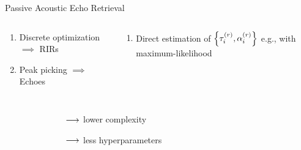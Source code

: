 \begin{frame}[t]{\alert{Passive} Acoustic Echo Retrieval \hfill\faBook}
        \vspace{.5em}
        \begin{columns}[T,onlytextwidth] %
            \begin{column}{.48\textwidth}
                \small
                \begin{enumerate}
                    \item Discrete optimization $\implies$ RIRs
                    \item Peak picking $\implies$ Echoes
                \end{enumerate}
            \end{column}
            \begin{column}{.48\textwidth}
                \small
                \begin{enumerate}
                    \item Direct estimation of $\set{\tauir, \ampir}$
                    e.g., with maximum-likelihood
                \end{enumerate}
            \end{column}%
        \end{columns}

        \vspace{1em}
        \begin{columns}[T,onlytextwidth] %
                \small
                \begin{itemize}
                    \item[\cmark] 
                    \item[\cmark] 
                    \\{\scriptsize~\cite{crocco2016estimation}}
                \end{itemize}
                \small
                \begin{itemize}
                    \item[\cmark] 
                    \begin{itemize}\footnotesize
                        \item[$\longrightarrow$] lower complexity
                        \item[$\longrightarrow$] less hyperparameters
                    \end{itemize}
                    \end{itemize}
        \end{columns}


\end{frame}
